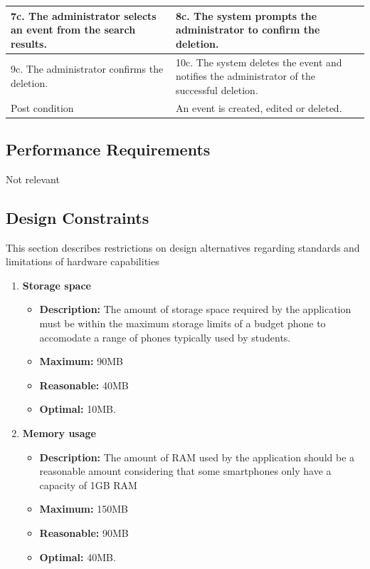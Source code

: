 \documentclass{article}
\begin{document}
\begin{center}
\begin{enumerate}
\begin{enumerate}
\begin{table}[]
\begin{tabular}{ | m{15em} | m{15em}| }
		\hline
		7c. The administrator selects an event from the search results.								& 8c. The system prompts the administrator to confirm the deletion. \\
		\hline
		9c. The administrator confirms the deletion.											& 10c. The system deletes the event and notifies the administrator of the successful deletion. \\
		\hline
		Post condition															& An event is created, edited or deleted. \\
		\hline
		\end{tabular}
	\end{table}
	\end{enumerate}
\end{enumerate}
\end{center}
	
	\subsection{Performance Requirements}
	Not relevant
	
	\subsection{Design Constraints}
	This section describes restrictions on design alternatives regarding standards and limitations of hardware capabilities
	\begin{enumerate}
		\item \textbf{Storage space}
		\begin{itemize}
			\item \textbf{Description:} The amount of storage space required by the application must be within the maximum storage limits of a budget phone to accomodate a range of phones typically used by students.
			\item \textbf{Maximum:} 90MB
			\item \textbf{Reasonable:} 40MB
			\item \textbf{Optimal:} 10MB.\newline
		\end{itemize}
	
		\item \textbf{Memory usage}
		\begin{itemize}
			\item \textbf{Description:} The amount of RAM used by the application should be a reasonable amount considering that some smartphones only have a capacity of 1GB RAM
			\item \textbf{Maximum:} 150MB
			\item \textbf{Reasonable:} 90MB
			\item \textbf{Optimal:} 40MB.\newline
		\end{itemize}
	\end{enumerate}
	
\end{document}
